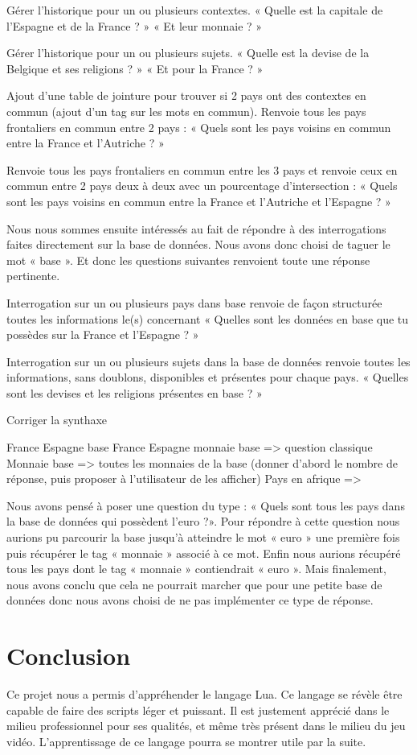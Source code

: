 \documentclass[11pt,a4paper]{article}
\begin{document}
Gérer l’historique pour un ou plusieurs contextes.
« Quelle est la capitale de l’Espagne et de la France ? »
« Et leur monnaie ? »
 
Gérer l’historique pour un ou plusieurs sujets.
« Quelle est la devise de la Belgique et ses religions ? »
« Et pour la France ? »
 
Ajout d’une table de jointure pour trouver si 2 pays ont des contextes en commun (ajout d’un tag sur les mots en commun). Renvoie tous les pays frontaliers en commun entre 2 pays :
« Quels sont les pays voisins en commun entre la France et l’Autriche ? »
 
Renvoie tous les pays frontaliers en commun entre les 3 pays et renvoie ceux en commun entre 2 pays deux à deux avec un pourcentage d’intersection :
« Quels sont les pays voisins en commun entre la France et l’Autriche et l’Espagne ? »
 
 
Nous nous sommes ensuite intéressés au fait de répondre à des interrogations faites directement sur la base de données. Nous avons donc choisi de taguer le mot « base ». Et donc les questions suivantes renvoient toute une réponse pertinente.
 
Interrogation sur un ou plusieurs pays dans base renvoie de façon structurée toutes les informations le(s) concernant
« Quelles sont les données en base que tu possèdes sur la France et l’Espagne ? »
 
Interrogation sur un ou plusieurs sujets dans la base de données renvoie toutes les informations, sans doublons, disponibles et présentes pour chaque pays.
« Quelles sont les devises et les religions présentes en base ? »
 
 
 
 
Corriger la synthaxe
 
France Espagne base
France Espagne monnaie base => question classique
Monnaie base => toutes les monnaies de la base  (donner d’abord le nombre de réponse, puis proposer à l’utilisateur de les afficher)
Pays en afrique =>
 
Nous avons pensé à poser une question du type : «  Quels sont tous les pays dans la base de données qui possèdent l’euro ?». Pour répondre à cette question nous aurions pu parcourir la base jusqu’à atteindre le mot « euro » une première fois puis  récupérer le tag « monnaie » associé à ce mot. Enfin nous aurions récupéré tous les pays dont le tag « monnaie » contiendrait « euro ». Mais finalement, nous avons conclu que cela ne pourrait marcher que pour une petite base de données donc nous avons choisi de ne pas implémenter ce type de réponse. 


\section{Conclusion}

Ce projet nous a permis d'appréhender le langage Lua. Ce langage se révèle être capable de faire des scripts léger et puissant. Il est justement apprécié dans le milieu professionnel pour ses qualités, et même très présent dans le milieu du jeu vidéo. L'apprentissage de ce langage pourra se montrer utile par la suite.
\end{document}
